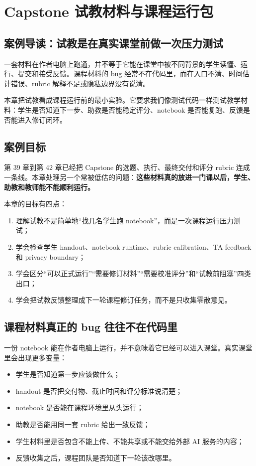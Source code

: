 \chapter{Capstone 试教材料与课程运行包}

\section{案例导读：试教是在真实课堂前做一次压力测试}

一套材料在作者电脑上跑通，并不等于它能在课堂中被不同背景的学生读懂、运行、提交和接受反馈。课程材料的 bug 经常不在代码里，而在入口不清、时间估计错误、rubric 解释不足或隐私边界没有说清。

本章把试教看成课程运行前的最小实验。它要求我们像测试代码一样测试教学材料：学生是否知道下一步、助教是否能稳定评分、notebook 是否能复跑、反馈是否能进入修订闭环。

\section{案例目标}

第 39 章到第 42 章已经把 Capstone 的选题、执行、最终交付和评分 rubric 连成一条线。本章处理另一个常被低估的问题：\textbf{这些材料真的放进一门课以后，学生、助教和教师能不能顺利运行。}

本章的目标有四点：

\begin{enumerate}
    \item 理解试教不是简单地“找几名学生跑 notebook”，而是一次课程运行压力测试；
    \item 学会检查学生 handout、notebook runtime、rubric calibration、TA feedback 和 privacy boundary；
    \item 学会区分“可以正式运行”“需要修订材料”“需要校准评分”和“试教前阻塞”四类出口；
    \item 学会把试教反馈整理成下一轮课程修订任务，而不是只收集零散意见。
\end{enumerate}

\section{课程材料真正的 bug 往往不在代码里}

一份 notebook 能在作者电脑上运行，并不意味着它已经可以进入课堂。真实课堂里会出现更多变量：

\begin{itemize}
    \item 学生是否知道第一步应该做什么；
    \item handout 是否把交付物、截止时间和评分标准说清楚；
    \item notebook 是否能在课程环境里从头运行；
    \item 助教是否能用同一套 rubric 给出一致反馈；
    \item 学生材料里是否包含不能上传、不能共享或不能交给外部 AI 服务的内容；
    \item 反馈收集之后，课程团队是否知道下一轮该改哪里。
\end{itemize}


